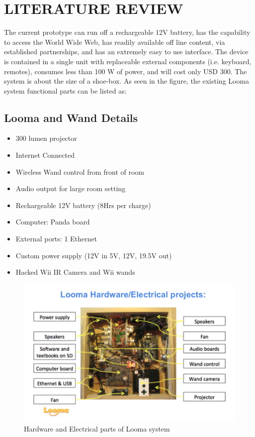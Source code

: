 \documentclass[12pt, a4paper]{article}
\begin{document}
\newpage
\section{LITERATURE REVIEW}
The current prototype can run off a rechargeable 12V battery, has the capability to access the World Wide Web, has readily available off line content, via established partnerships, and has an extremely easy to use interface. The device is contained in a single unit with replaceable external components (i.e. keyboard, remotes), consumes less than 100 W of power, and will cost only USD 300. The system is about the size of a shoe-box. 
As seen in the figure, the existing Looma system functional parts can be listed as:

\subsection{Looma and Wand Details}
\begin{itemize}
\item300 lumen projector
\item Internet Connected 
\item Wireless Wand control from front of room
\item Audio output for large room setting
\item Rechargeable 12V battery (8Hrs per charge)
\item Computer: Panda board
\item External ports: 1 Ethernet
\item Custom power supply (12V in 5V, 12V, 19.5V out)
\item Hacked Wii IR Camera and Wii wands
\end{itemize}

\begin{figure}[htp]
\centering
\includegraphics[scale=0.22]{looma.png}
\caption{Hardware and Electrical parts of Looma system}
\label{}
\end{figure}
\end{document}
